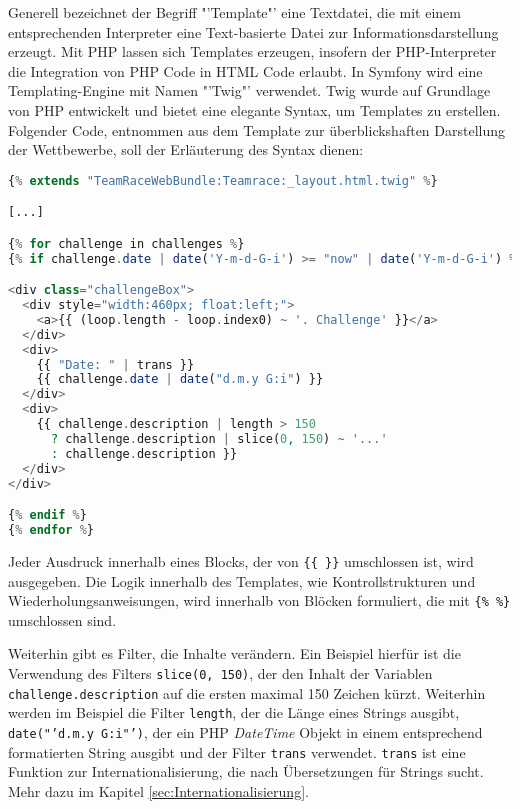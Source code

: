 \documentclass[12pt]{report}
\begin{document}
Generell bezeichnet der Begriff "'Template"' eine Textdatei, die mit einem entsprechenden Interpreter eine Text-basierte Datei zur Informationsdarstellung erzeugt. Mit PHP lassen sich Templates erzeugen, insofern der PHP-Interpreter die Integration von PHP Code in HTML Code erlaubt. In Symfony wird eine Templating-Engine mit Namen "'Twig"' verwendet. Twig wurde auf Grundlage von PHP entwickelt und bietet eine elegante Syntax, um Templates zu erstellen. Folgender Code, entnommen aus dem Template zur überblickshaften Darstellung der Wettbewerbe, soll der Erläuterung des Syntax dienen:
\begin{lstlisting}[language=PHP, caption=Auszug aus\\ src/TeamRace/WebBundle/Resources/views/Teamrace/challenges.html.twig, label=lst:challenges]
{% extends "TeamRaceWebBundle:Teamrace:_layout.html.twig" %}

[...]

{% for challenge in challenges %}
{% if challenge.date | date('Y-m-d-G-i') >= "now" | date('Y-m-d-G-i') %}

<div class="challengeBox">
  <div style="width:460px; float:left;">
    <a>{{ (loop.length - loop.index0) ~ '. Challenge' }}</a>
  </div>
  <div>
    {{ "Date: " | trans }}
    {{ challenge.date | date("d.m.y G:i") }}
  </div>
  <div>
    {{ challenge.description | length > 150 
      ? challenge.description | slice(0, 150) ~ '...' 
      : challenge.description }}
  </div>
</div>

{% endif %}
{% endfor %}

\end{lstlisting}


Jeder Ausdruck innerhalb eines Blocks, der von \texttt{\{\{ \}\}} umschlossen ist, wird ausgegeben. Die Logik innerhalb des Templates, wie Kontrollstrukturen und Wiederholungsanweisungen, wird innerhalb von Blöcken formuliert, die mit \texttt{\{\% \%\}} umschlossen sind.

Weiterhin gibt es Filter, die Inhalte verändern. Ein Beispiel hierfür ist die Verwendung des Filters \texttt{slice(0, 150)}, der den Inhalt der Variablen \texttt{challenge.description} auf die ersten maximal 150 Zeichen kürzt. Weiterhin werden im Beispiel die Filter \texttt{length}, der die Länge eines Strings ausgibt, \texttt{date("'d.m.y G:i"')}, der ein PHP \emph{DateTime} Objekt in einem entsprechend formatierten String ausgibt und der Filter \texttt{trans} verwendet. \texttt{trans} ist eine Funktion zur Internationalisierung, die nach Übersetzungen für Strings sucht. Mehr dazu im Kapitel \ref{sec:Internationalisierung}.
\end{document}
